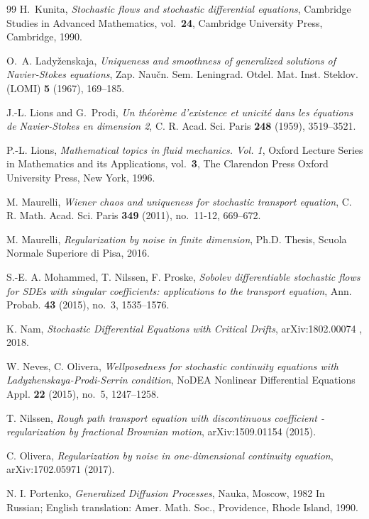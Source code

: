 \documentclass[a4paper,10pt]{article}
\newcommand\1{\mathbbm{1}}
\numberwithin{equation}{section}
\begin{document}
\begin{thebibliography}{99}
H.~Kunita, \textit{Stochastic flows and stochastic differential equations},
  Cambridge Studies in Advanced Mathematics, vol.~{\bf24}, Cambridge University
  Press, Cambridge, 1990.

O.~A. Lady{\v{z}}enskaja, \textit{Uniqueness and smoothness of generalized
  solutions of {N}avier-{S}tokes equations}, Zap. Nau\v cn. Sem. Leningrad.
  Otdel. Mat. Inst. Steklov. (LOMI) \textbf{{\bf5}} (1967), 169--185.

J.-L. Lions and G.~Prodi, \textit{Un th\'eor\`eme d'existence et unicit\'e dans
  les \'equations de {N}avier-{S}tokes en dimension 2}, C. R. Acad. Sci. Paris
  \textbf{{\bf248}} (1959), 3519--3521.

P.-L. Lions, \textit{Mathematical topics in fluid mechanics. {V}ol. 1}, Oxford
  Lecture Series in Mathematics and its Applications, vol.~{\bf3}, The
  Clarendon Press Oxford University Press, New York, 1996.

M. Maurelli, \textit{Wiener chaos and uniqueness for stochastic transport equation}, C. R. Math. Acad. Sci. Paris \textbf{349} (2011), no.~11-12, 669--672.

M. Maurelli, \textit{Regularization by noise in finite dimension}, Ph.D. Thesis, Scuola Normale Superiore di Pisa, 2016. 

S.-E. A. Mohammed, T. Nilssen, F. Proske, \textit{Sobolev differentiable stochastic flows for {SDE}s with singular coefficients: applications to the transport equation}, Ann. Probab. {\bf43} (2015), no.~3, 1535--1576.

 K. Nam, \textit{Stochastic Differential Equations with Critical Drifts}, arXiv:1802.00074 , 2018.

 W. Neves, C. Olivera, \textit{Wellposedness for stochastic continuity equations with {L}adyzhenskaya-{P}rodi-{S}errin condition}, NoDEA Nonlinear Differential Equations Appl. {\bf 22} (2015), no.~5, 1247--1258.

T. Nilssen, \textit{Rough path transport equation with discontinuous coefficient - regularization by fractional Brownian motion}, arXiv:1509.01154 (2015).

C. Olivera, \textit{Regularization by noise in one-dimensional continuity equation}, arXiv:1702.05971 (2017).

N. I. Portenko, \textit{Generalized Diffusion Processes}, Nauka, Moscow, 1982
In Russian; English translation: Amer. Math. Soc., Providence, Rhode Island, 1990.


\end{thebibliography}
\end{document}
